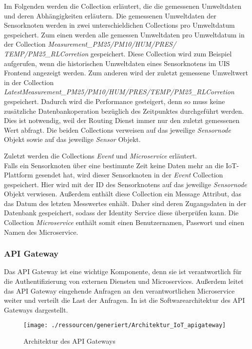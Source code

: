 Im Folgenden werden die Collection erläutert, die die gemessenen Umweltdaten und deren Abhängigkeiten erläutern. 
Die gemessenen Umweltdaten der Sensorknoten werden in zwei unterschieldichen Collections pro Umweltdatum gespeichert. 
Zum einen werden alle gemessen Umweltdaten pro Umweltdatum in der Collection \textit{Measurement\_PM25/PM10/HUM/PRES/}
\textit{TEMP/PM25\_RLCorretion} gespeichert. 
Diese Collection wird zum Beispiel aufgerufen, wenn die historischen Umweltdaten eines Sensorknotens im UIS Frontend angezeigt werden. 
Zum anderen wird der zuletzt gemessene Umweltwert in der Collection \textit{LatestMeasurement\_PM25/PM10/HUM/PRES/TEMP/PM25\_RLCorretion} gespeichert. 
Dadurch wird die Performance gesteigert, denn so muss keine zusätzliche Datenbankoperation bezüglich des Zeitpunktes durchgeführt werden. 
Dies ist notwendig, weil der Routing Dienst immer nur den zuletzt gemessenen Wert abfragt. 
Die beiden Collections verweisen auf das jeweilige \textit{Sensornode} Objekt sowie auf das jeweilige \textit{Sensor} Objekt. 


Zuletzt werden die Collections \textit{Event} und \textit{Microservice} erläutert. \\
Falls ein Sensorknoten über eine bestimmte Zeit keine Daten mehr an die IoT-Plattform gesendet hat, wird dieser Sensorknoten in der \textit{Event} Collection gespeichert. 
Hier wird mit der ID des Sensorknotens auf das jeweilige \textit{Sensornode} Objekt verwiesen. 
Außerdem enthält diese Collection ein Message Attribut, das das Datum des letzten Messwertes enhält. 
Daher sind deren Zugangsdaten in der Datenbank gespeichert, sodass der Identity Service diese überprüfen kann. 
Die Collection \textit{Microservice} enthält somit einen Benutzernamen, Passwort und einen Namen des Microservice.
\FloatBarrier

\subsubsection{API Gateway}
\label{sec:arch:iot:api}
Das API Gateway ist eine wichtige Komponente, denn sie ist verantwortlich für die Authentifizierung von externen Diensten und Microservices.
Außerdem leitet das API Gateway eingehende Anfragen an den verantwortlichen Microservice weiter und verteilt die Last der Anfragen.
\newline
In  ist die Softwarearchitektur des API Gateways dargestellt.
\begin{figure}[!htb]
	\centering
	\texttt{[image: ./ressourcen/generiert/Architektur\_IoT\_apigateway]}
	\caption{Architektur des API Gateways}
	\label{fig:architectureApiGateway}
\end{figure}
\afterpage{\clearpage}


